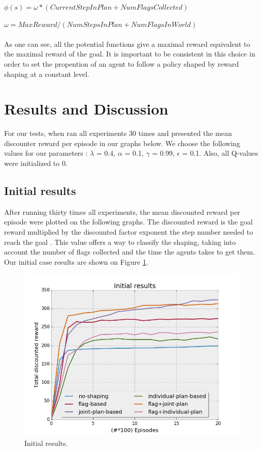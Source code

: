 \documentclass[letterpaper]{article}
\begin{document}
$\phi (s) = \omega * (CurrentStepInPlan + NumFlagsCollected)$

$\omega = MaxReward/(NumStepsInPlan + NumFlagsInWorld)$\\\\


As one can see, all the potential functions give a maximal reward equivalent to the maximal reward of the goal. It is important to be consistent in this choice in order to set the propention of an agent to follow a policy shaped by reward shaping at a constant level.


\section{Results and Discussion}

For our tests, when ran all experiments 30 times and presented the mean discounter reward per episode in our graphs below. We choose the following values for our parameters : $\lambda$ = 0.4, $\alpha$ = 0.1, $\gamma$ = 0.99, $\epsilon$ = 0.1. Also, all Q-values were initialized to 0.

\subsection{Initial results}

After running thirty times all experiments, the mean discounted reward per episode were plotted on the following graphs. The discounted reward is the goal reward multiplied by the discounted factor exponent the step number needed to reach the goal  \citep{SCpbrs}. This value offers a way to classify the shaping, taking into account the number of flags collected and the time the agents takes to get them.\\
 Our initial case results are shown on Figure \ref{fig:results1}. \\

\begin{figure}[h!]
  \includegraphics[width=\linewidth]{img/initial.png}
  \caption{Initial results.}
  \label{fig:results1}
\end{figure}
\end{document}
